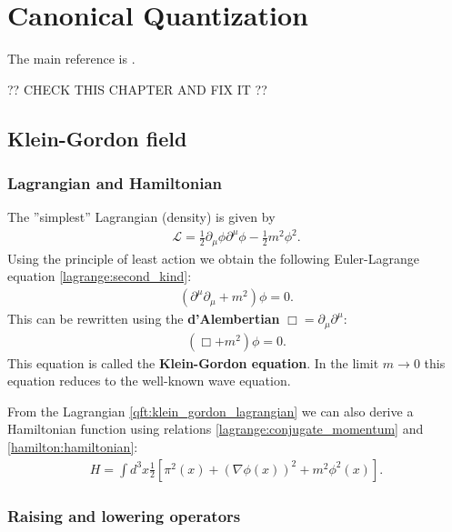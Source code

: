 \chapter{Canonical Quantization}

    The main reference is \cite{Peskin}.

    ?? CHECK THIS CHAPTER AND FIX IT ??

\section{Klein-Gordon field}
\subsection{Lagrangian and Hamiltonian}

    The ''simplest'' Lagrangian (density) is given by
    \begin{gather}
        \label{qft:klein_gordon_lagrangian}
        \mathcal{L} = \frac{1}{2}\partial_\mu\phi\partial^\mu\phi - \frac{1}{2}m^2\phi^2.
    \end{gather}
    Using the principle of least action we obtain the following Euler-Lagrange equation \ref{lagrange:second_kind}:
    \begin{gather}
        \left(\partial^\mu\partial_\mu + m^2\right)\phi = 0.
    \end{gather}
    This can be rewritten using the \textbf{d'Alembertian} $\Box = \partial_\mu\partial^\mu$:
    \begin{gather}
        \label{qft:klein_gordon_equation}
        (\Box+m^2)\phi = 0.
    \end{gather}
    This equation is called the \textbf{Klein-Gordon equation}. In the limit $m\rightarrow0$ this equation reduces to the well-known wave equation.

    From the Lagrangian \ref{qft:klein_gordon_lagrangian} we can also derive a Hamiltonian function using relations \ref{lagrange:conjugate_momentum} and \ref{hamilton:hamiltonian}:
    \begin{gather}
        \label{qft:klein_gordon_hamiltonian}
        H = \int d^3x \frac{1}{2}\left[\pi^2(x) + (\nabla\phi(x))^2 + m^2\phi^2(x)\right].
    \end{gather}

\subsection{Raising and lowering operators}

